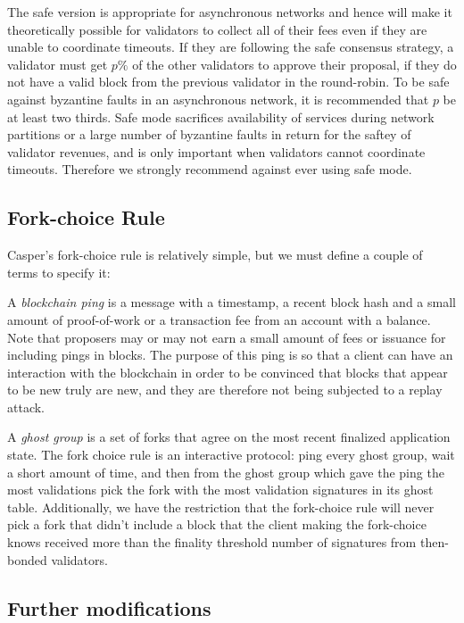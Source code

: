 \documentclass[11pt,a4paper]{article}
\begin{document}
The safe version is appropriate for asynchronous networks and hence will make it theoretically possible for validators to collect all of their fees even if they are unable to coordinate timeouts. If they are following the safe consensus strategy, a validator must get $p\%$ of the other validators to approve their proposal, if they do not have a valid block from the previous validator in the round-robin. To be safe against byzantine faults in an asynchronous network, it is recommended that $p$ be at least two thirds. Safe mode sacrifices availability of services during network partitions or a large number of byzantine faults in return for the saftey of validator revenues, and is only important when validators cannot coordinate timeouts. Therefore we strongly recommend against ever using safe mode.


\subsection{Fork-choice Rule}

Casper's fork-choice rule is relatively simple, but we must define a couple of terms to specify it: 

A \emph{blockchain ping} is a message with a timestamp, a recent block hash and a small amount of proof-of-work or a transaction fee from an account with a balance. Note that proposers may or may not earn a small amount of fees or issuance for including pings in blocks. The purpose of this ping is so that a client can have an interaction with the blockchain in order to be convinced that blocks that appear to be new truly are new, and they are therefore not being subjected to a replay attack.

A \emph{ghost group} is a set of forks that agree on the most recent finalized application state. The fork choice rule is an interactive protocol: ping every ghost group, wait a short amount of time, and then from the ghost group which gave the ping the most validations pick the fork with the most validation signatures in its ghost table. Additionally, we have the restriction that the fork-choice rule will never pick a fork that didn't include a block that the client making the fork-choice knows received more than the finality threshold number of signatures from then-bonded validators.


\subsection{Further modifications}
\end{document}

